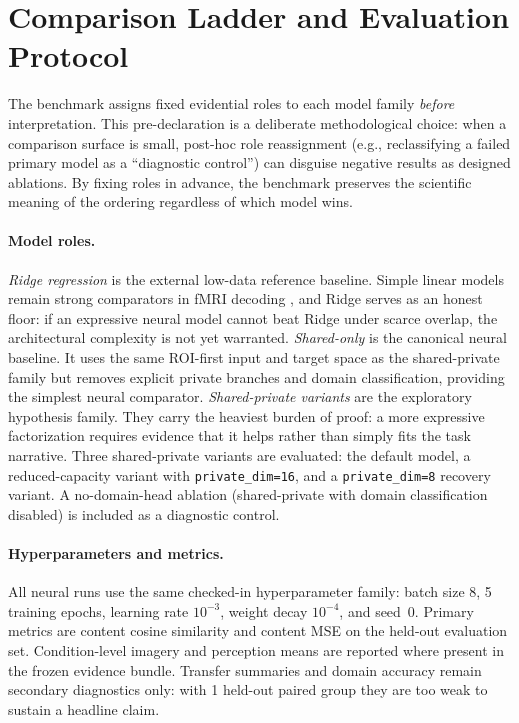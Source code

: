 \documentclass{article}
\begin{document}
\section{Comparison Ladder and Evaluation Protocol}

The benchmark assigns fixed evidential roles to each model family
\emph{before} interpretation.  This pre-declaration is a deliberate
methodological choice: when a comparison surface is small, post-hoc role
reassignment (e.g., reclassifying a failed primary model as a ``diagnostic
control'') can disguise negative results as designed ablations.  By fixing
roles in advance, the benchmark preserves the scientific meaning of the
ordering regardless of which model wins.

\paragraph{Model roles.}
\emph{Ridge regression} is the external low-data reference baseline.  Simple
linear models remain strong comparators in fMRI decoding
\citep{naselaris2011encoding}, and Ridge serves as an honest floor: if an
expressive neural model cannot beat Ridge under scarce overlap, the
architectural complexity is not yet warranted.  \emph{Shared-only} is the
canonical neural baseline.  It uses the same ROI-first input and target space as
the shared-private family but removes explicit private branches and domain
classification, providing the simplest neural comparator.  \emph{Shared-private
variants} are the exploratory hypothesis family.  They carry the heaviest burden
of proof: a more expressive factorization requires evidence that it helps rather
than simply fits the task narrative.  Three shared-private variants are
evaluated: the default model, a reduced-capacity variant with
\texttt{private\_dim=16}, and a \texttt{private\_dim=8} recovery variant.  A
no-domain-head ablation (shared-private with domain classification disabled) is
included as a diagnostic control.

\paragraph{Hyperparameters and metrics.}
All neural runs use the same checked-in hyperparameter family: batch size 8, 5
training epochs, learning rate $10^{-3}$, weight decay $10^{-4}$, and seed~0.
Primary metrics are content cosine similarity and content MSE on the held-out
evaluation set.  Condition-level imagery and perception means are reported where
present in the frozen evidence bundle.  Transfer summaries and domain accuracy
remain secondary diagnostics only: with 1 held-out paired group they are too
weak to sustain a headline claim.
\end{document}
